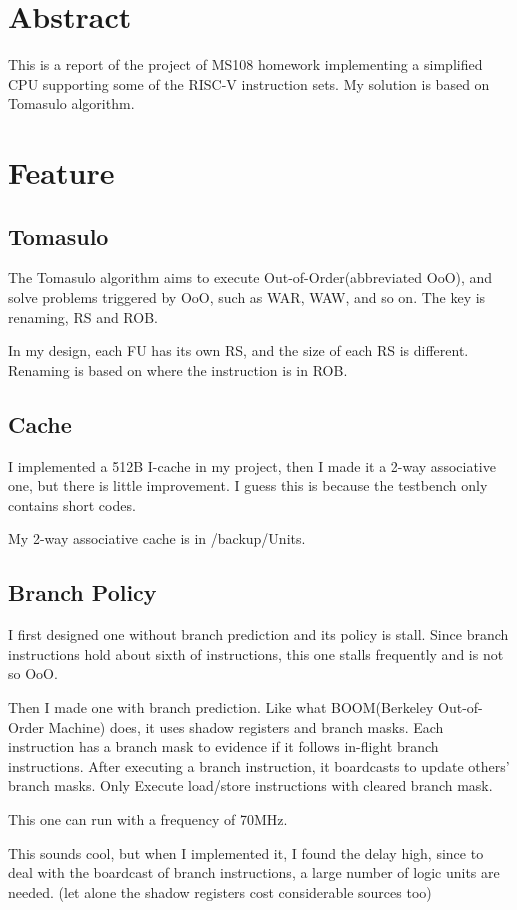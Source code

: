 \documentclass[12pt,letterpaper]{article}
\begin{document}
\section{Abstract}
    This is a report of the project of MS108 homework implementing a simplified CPU supporting some of the RISC-V instruction sets. 
    My solution is based on Tomasulo algorithm. 
\section{Feature}
\subsection{Tomasulo}
    The Tomasulo algorithm aims to execute Out-of-Order(abbreviated OoO), 
    and solve problems triggered by OoO, such as WAR, WAW, and so on. The key is renaming, 
    RS and ROB. 

    In my design, each FU has its own RS, and the size of each RS is different. 
    Renaming is based on where the instruction is in ROB. 
\subsection{Cache}
    I implemented a 512B I-cache in my project, then I made it a 2-way associative one, but there is little improvement. 
    I guess this is because the testbench only contains short codes. 

    My 2-way associative cache is in /backup/Units. 
\subsection{Branch Policy}
    I first designed one without branch prediction and its policy is stall. Since branch instructions hold about sixth of instructions, 
    this one stalls frequently and is not so OoO. 

    Then I made one with branch prediction. Like what BOOM(Berkeley Out-of-Order Machine) does, it uses shadow registers and branch masks. 
    Each instruction has a branch mask to evidence if it follows in-flight branch instructions. After executing a branch instruction, 
    it boardcasts to update others' branch masks. Only Execute load/store instructions with cleared branch mask. 
    
    This one can run with a frequency of 70MHz. 

    This sounds cool, but when I implemented it, I found the delay high, since to deal with the boardcast of branch instructions, 
    a large number of logic units are needed. (let alone the shadow registers cost considerable sources too)
\end{document}
